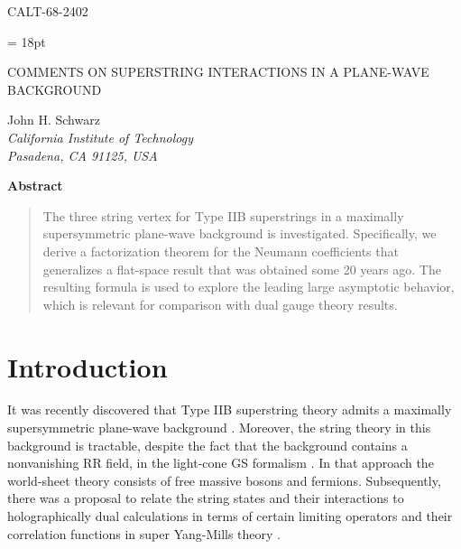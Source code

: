 \documentclass[a4paper,12pt]{article}
\begin{document}
\vspace*{-.6in}
\thispagestyle{empty}
\begin{flushright}
CALT-68-2402
\end{flushright}
\baselineskip = 18pt

\vspace{1.5in} {\Large
\begin{center}
COMMENTS ON SUPERSTRING INTERACTIONS IN A PLANE-WAVE
BACKGROUND\end{center}} \vspace{.5in}

\begin{center}
John H. Schwarz
\\
\emph{California Institute of Technology\\ Pasadena, CA  91125, USA}
\end{center}
\vspace{1in}

\begin{center}
\textbf{Abstract}
\end{center}
\begin{quotation}
\noindent The three string vertex for Type IIB superstrings in a
maximally supersymmetric plane-wave background is investigated.
Specifically, we derive a factorization theorem for the Neumann
coefficients that generalizes a flat-space result that was
obtained some 20 years ago. The resulting formula is used to
explore the leading large \myHighlight{$\mu$}\coordHE{} asymptotic behavior, which is
relevant for comparison with dual gauge theory results.
\end{quotation}

\newpage


\section{Introduction}

It was recently discovered that Type IIB superstring theory admits
a maximally supersymmetric plane-wave background
\cite{Blau:2001ne}. Moreover, the string theory in this background
is tractable, despite the fact that the background contains a
nonvanishing RR field, in the light-cone GS formalism
\cite{Metsaev:2001bj}. In that approach the world-sheet theory
consists of free massive bosons and fermions. Subsequently, there
was a proposal to relate the string states and their interactions
to holographically dual calculations in terms of certain limiting
operators and their correlation functions in \coordHE{} super
Yang-Mills theory \cite{Berenstein:2002jq}.
\end{document}
